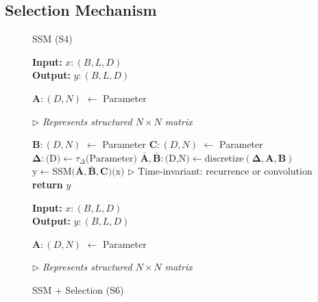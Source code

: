 \documentclass{article}
\theoremstyle{definition}
\begin{document}
\subsection{Selection Mechanism}
 \vspace{-17mm}
{\ttfamily
\begin{figure}[ht!]
    \centering
    \begin{minipage}[t]{0.48\textwidth}
    \begin{algorithm}[H]
    \caption{SSM (S4)}
    \label{alg:ssm-s4}
    \textbf{Input:} $x \colon (B,L,D)$ \\
    \textbf{Output:} $y \colon (B,L,D)$
    
    
    
    \begin{algorithmic}[1]
      \State \textbf{A}$ \colon (D, N)$ \hfill \(\leftarrow\) Parameter

      \medskip%

        \noindent \(\triangleright\) \emph{Represents structured $N \times N$ matrix}
    
      \State \textbf{B}$ \colon (D, N)$ \hfill \(\leftarrow\) Parameter
      \State \textbf{C}$ \colon (D, N)$ \hfill \(\leftarrow\) Parameter
      \State $\bm{\Delta}: \text{(D)} \leftarrow \tau_{\Delta}  \text{(Parameter)}$
      \State $\bar{\bm{A}} , \bar{\bm{B}}: \text{(D,N)} \leftarrow \text{discretize}(\bm{\Delta , A,B})$
      \State $\text{y} \leftarrow \text{SSM($\bar{\bm{A}} , \bar{\bm{B}} ,{\bm{C}}$)(x)}$
      \State  \hfill \(\triangleright\) Time-invariant: recurrence or convolution
      \State \textbf{return} $y$
    \end{algorithmic}
    \end{algorithm}
    \end{minipage}
    \hfill
    \begin{minipage}[t]{0.48\textwidth}
    \begin{algorithm}[H]
    \caption{SSM + Selection (S6)}
    \label{alg:ssm-s6}
    \textbf{Input:} $x \colon (B,L,D)$ \\
    \textbf{Output:} $y \colon (B,L,D)$
    
    
    
    \begin{algorithmic}[1]
      \State \textbf{A}$ \colon (D, N)$ \hfill \(\leftarrow\) Parameter

      \medskip%

        \noindent \(\triangleright\) \emph{Represents structured $N \times N$ matrix}
    

\end{algorithmic}
\end{algorithm}
\end{minipage}
\end{figure}}
\end{document}
